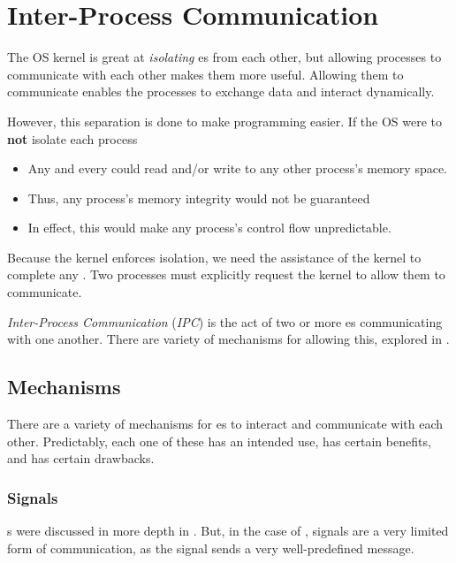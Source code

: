 \section{Inter-Process Communication}\label{sec:Inter_Process_Communication}
The OS kernel is great at \emph{isolating} es from each other, but allowing processes to communicate with each other makes them more useful.
Allowing them to communicate enables the processes to exchange data and interact dynamically.

However, this separation is done to make programming easier.
If the OS were to \textbf{not} isolate each process
\begin{itemize}[noitemsep]
\item Any and every  could read and/or write to any other process's memory space.
\item Thus, any process's memory integrity would not be guaranteed
\item In effect, this would make any process's control flow unpredictable.
\end{itemize}

Because the kernel enforces isolation, we need the assistance of the kernel to complete any .
Two processes must explicitly request the kernel to allow them to communicate.

\begin{definition}\label{def:IPC}
  \emph{Inter-Process Communication} (\emph{IPC}) is the act of two or more es communicating with one another.
  There are variety of mechanisms for allowing this, explored in .
\end{definition}

\subsection{Mechanisms}\label{subsec:IPC_Mechanisms}
There are a variety of mechanisms for es to interact and communicate with each other.
Predictably, each one of these has an intended use, has certain benefits, and has certain drawbacks.

\subsubsection{Signals}\label{subsubsec:IPC_Mechanism-Signals}
s were discussed in more depth in .
But, in the case of , signals are a very limited form of communication, as the signal sends a very well-predefined message.

